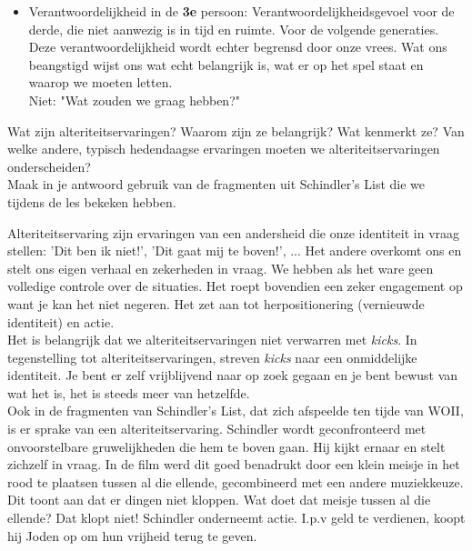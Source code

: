 \documentclass[main.tex]{subfiles}
\begin{document}
\begin{examenvraag}
\begin{antwoord}
\begin{itemize}
    		
    		\item Verantwoordelijkheid in de \textbf{3e} persoon: Verantwoordelijkheidsgevoel voor de derde, die niet aanwezig is in tijd en ruimte. Voor de volgende generaties.
    		Deze verantwoordelijkheid wordt echter begrensd door onze vrees. Wat ons beangstigd wijst ons wat echt belangrijk is, wat er op het spel staat en waarop we moeten letten.\\
    		Niet: "Wat zouden we graag hebben?"
    	\end{itemize}
    \end{antwoord}
\end{examenvraag}


\begin{examenvraag}
    \begin{vraag}
        Wat zijn alteriteitservaringen? Waarom zijn ze belangrijk? Wat kenmerkt ze? Van welke andere, typisch hedendaagse ervaringen moeten we alteriteitservaringen onderscheiden?\\
        Maak in je antwoord gebruik van de fragmenten uit Schindler’s List die we tijdens de les bekeken hebben.
    \end{vraag}

    \begin{antwoord}
    	Alteriteitservaring zijn ervaringen van een andersheid die onze identiteit in vraag stellen: 'Dit ben ik niet!', 'Dit gaat mij te boven!', ... Het andere overkomt ons en stelt ons eigen verhaal en zekerheden in vraag. We hebben als het ware geen volledige controle over de situaties. Het roept bovendien een zeker engagement op want je kan het niet negeren. Het zet aan tot herpositionering (vernieuwde identiteit) en actie.\\
    	Het is belangrijk dat we alteriteitservaringen niet verwarren met \textit{kicks}. In tegenstelling tot alteriteitservaringen, streven \textit{kicks} naar een onmiddelijke identiteit. Je bent er zelf vrijblijvend naar op zoek gegaan en je bent bewust van wat het is, het is steeds meer van hetzelfde.\\
    	Ook in de fragmenten van Schindler's List, dat zich afspeelde ten tijde van WOII, is er sprake van een alteriteitservaring. Schindler wordt geconfronteerd met onvoorstelbare gruwelijkheden die hem te boven gaan. Hij kijkt ernaar en stelt zichzelf in vraag. In de film werd dit goed benadrukt door een klein meisje in het rood te plaatsen tussen al die ellende, gecombineerd met een andere muziekkeuze. Dit toont aan dat er dingen niet kloppen. Wat doet dat meisje tussen al die ellende? Dat klopt niet! Schindler onderneemt actie. I.p.v geld te verdienen, koopt hij Joden op om hun vrijheid terug te geven.
    	
    \end{antwoord}
\end{examenvraag}
\end{document}
